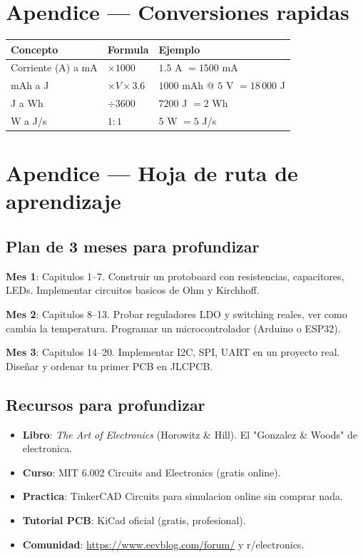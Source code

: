 \documentclass[11pt,a4paper,oneside,openright]{book}
\begin{document}
\chapter{Apendice --- Conversiones rapidas}

\begin{center}
\begin{tabular}{lll}
\toprule
\textbf{Concepto} & \textbf{Formula} & \textbf{Ejemplo} \\
\midrule
Corriente (A) a mA   & $\times 1000$    & $1.5$ A $= 1500$ mA \\
mAh a J              & $\times V \times 3.6$ & $1000$ mAh @ $5$ V $= 18\,000$ J \\
J a Wh               & $\div 3600$       & $7200$ J $= 2$ Wh \\
W a J/s              & $1:1$             & 5 W $= 5$ J/s \\
\bottomrule
\end{tabular}
\end{center}

\chapter{Apendice --- Hoja de ruta de aprendizaje}

\section{Plan de 3 meses para profundizar}

\textbf{Mes 1}: Capitulos 1--7. Construir un protoboard con resistencias,
capacitores, LEDs. Implementar circuitos basicos de Ohm y Kirchhoff.

\textbf{Mes 2}: Capitulos 8--13. Probar reguladores LDO y switching reales,
ver como cambia la temperatura. Programar un microcontrolador (Arduino o
ESP32).

\textbf{Mes 3}: Capitulos 14--20. Implementar I2C, SPI, UART en un proyecto
real. Diseñar y ordenar tu primer PCB en JLCPCB.

\section{Recursos para profundizar}

\begin{itemize}[leftmargin=2em]
  \item \textbf{Libro}: \emph{The Art of Electronics} (Horowitz \& Hill).
        El "Gonzalez \& Woods" de electronica.
  \item \textbf{Curso}: MIT 6.002 Circuits and Electronics (gratis online).
  \item \textbf{Practica}: TinkerCAD Circuits para simulacion online sin
        comprar nada.
  \item \textbf{Tutorial PCB}: KiCad oficial (gratis, profesional).
  \item \textbf{Comunidad}: \url{https://www.eevblog.com/forum/} y r/electronics.
\end{itemize}
\end{document}

